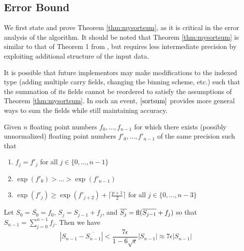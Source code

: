   \subsection{Error Bound}
    \label{sec:primitiveops_error}

    We first state and prove Theorem \ref{thm:mysortsum}, as it is critical in the error analysis of the algorithm. It should be noted that Theorem \ref{thm:mysortsum} is similar to that of Theorem 1 from \cite{sortsum}, but requires less intermediate precision by exploiting additional structure of the input data.

    It is possible that future implementors may make modifications to the indexed type (adding multiple carry fields, changing the binning scheme, etc.) such that the summation of its fields cannot be reordered to satisfy the assumptions of Theorem \ref{thm:mysortsum}. In such an event, $\cite{sortsum}$ provides more general ways to sum the fields while still maintaining accuracy.
      \begin{samepage}
    \begin{thm}
      Given $n$ floating point numbers $f_0, ..., f_{n - 1}$ for which there exists (possibly unnormalized) floating point numbers $f'_0, ..., f'_{n - 1}$ of the same precision such that
      \begin{enumerate}
        \item $f_j = f'_j$ for all $j \in \{0, ..., n - 1\}$
        \item $\exp(f'_0) > ... > \exp(f'_{n - 1})$
        \item $\exp(f'_j) \geq \exp(f'_{j + 2}) + \lceil\frac{p + 1}{2}\rceil$ for all $j \in \{0, ..., n - 3\}$
      \end{enumerate}
      \label{thm:mysortsum}
      Let $S_0 = \overline{S_0} = f_0$, $S_j = S_{j - 1} + f_j$, and $\overline{S_j} = \text{fl}(\overline{S_{j - 1}} + f_j)$ so that $S_{n - 1} = \sum \limits_{j = 0}^{n - 1} f_j$.
      Then we have
      \begin{equation*}
        \left|S_{n - 1} - \overline{S_{n - 1}}\right| < \frac{7\epsilon}{1 - 6\sqrt\epsilon}|S_{n - 1}| \approx 7 \epsilon |S_{n - 1}|
      \end{equation*}
    \end{thm}
    \end{samepage}

